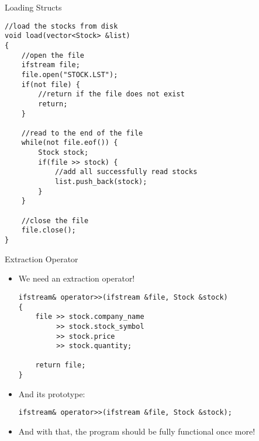 \documentclass[]{beamer}
\begin{document}
\begin{frame}[fragile]{Loading Structs}
\begin{adjustbox}{max totalheight=0.9\textheight}
\begin{BVerbatim}
//load the stocks from disk
void load(vector<Stock> &list)
{
    //open the file
    ifstream file;
    file.open("STOCK.LST");
    if(not file) {
        //return if the file does not exist
        return;
    }

    //read to the end of the file
    while(not file.eof()) {
        Stock stock;
        if(file >> stock) {
            //add all successfully read stocks
            list.push_back(stock);
        }
    }

    //close the file
    file.close();
}
\end{BVerbatim}
\end{adjustbox}
\end{frame}

\begin{frame}[fragile]{Extraction Operator}
    \begin{itemize}[<+->]
        \item We need an extraction operator!
        \begin{adjustbox}{max width=0.9\textwidth}
        \begin{BVerbatim}
ifstream& operator>>(ifstream &file, Stock &stock)
{
    file >> stock.company_name
         >> stock.stock_symbol
         >> stock.price
         >> stock.quantity;

    return file;
}
        \end{BVerbatim}
        \end{adjustbox}
        \item And its prototype:
        \begin{adjustbox}{max width=0.9\textwidth}
        \begin{BVerbatim}
ifstream& operator>>(ifstream &file, Stock &stock);
        \end{BVerbatim}
        \end{adjustbox}
        \item And with that, the program should be fully functional
            once more!
    \end{itemize}
\end{frame}
\end{document}
